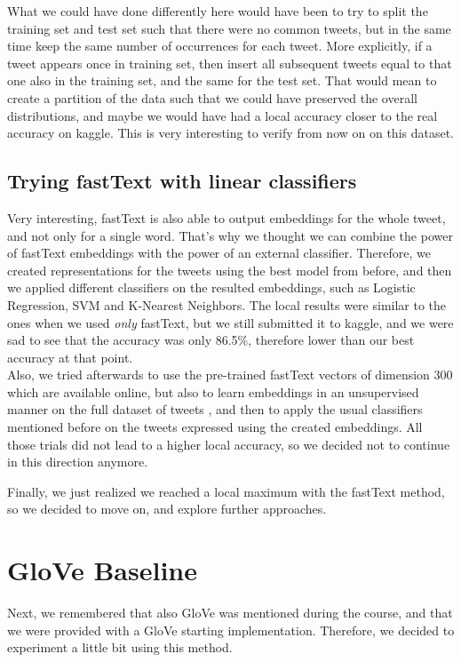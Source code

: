 \documentclass[10pt,conference,compsocconf]{IEEEtran}
\begin{document}
What we could have done differently here would have been to try to split the training set and test set such that there were no common tweets, but in the same time keep the same number of occurrences for each tweet. More explicitly, if a tweet appears once in training set, then insert all subsequent tweets equal to that one also in the training set, and the same for the test set. That would mean to create a partition of the data such that we could have preserved the overall distributions, and maybe we would have had a local accuracy closer to the real accuracy on kaggle. This is very interesting to verify from now on on this dataset.  

\subsection{Trying fastText with linear classifiers}

Very interesting, fastText is also able to output embeddings for the whole tweet, and not only for a single word. That's why we thought we can combine the power of fastText embeddings with the power of an external classifier. Therefore, we created representations for the tweets using the best model from before, and then we applied different classifiers on the resulted embeddings, such as Logistic Regression, SVM and K-Nearest Neighbors. The local results were similar to the ones when we used \textit{only} fastText, but we still submitted it to kaggle, and we were sad to see that the accuracy was only 86.5\%, therefore lower than our best accuracy at that point. \\

Also, we tried afterwards to use the pre-trained fastText vectors of dimension 300 which are available online, but also to learn embeddings in an unsupervised manner on the full dataset of tweets \cite{BGJ16+}, and then to apply the usual classifiers mentioned before on the tweets expressed using the created embeddings. All those trials did not lead to a higher local accuracy, so we decided not to continue in this direction anymore.

Finally, we just realized we reached a local maximum with the fastText method, so we decided to move on, and explore further approaches.

\section{GloVe Baseline}

Next, we remembered that also GloVe \cite{PSM14} was mentioned during the course, and that we were provided with a GloVe starting implementation. Therefore, we decided to experiment a little bit using this method.
\end{document}
